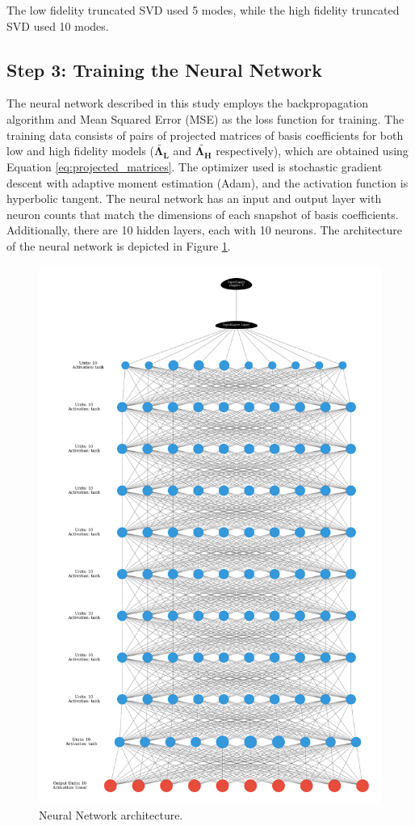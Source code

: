 \documentclass[10pt,oneside,a4paper,twocolumn]{article}
\begin{document}
The low fidelity truncated SVD used 5 modes, while the high fidelity truncated SVD used 10 modes.

\subsection{Step 3: Training the Neural Network}

The neural network described in this study employs the backpropagation algorithm and Mean Squared Error (MSE) as the loss function for training. The training data consists of pairs of projected matrices of basis coefficients for both low and high fidelity models ($\tilde{\mathbf{\Lambda_L}}$ and $\tilde{\mathbf{\Lambda_H}}$ respectively), which are obtained using Equation \eqref{eq:projected_matrices}. The optimizer used is stochastic gradient descent with adaptive moment estimation (Adam), and the activation function is hyperbolic tangent. The neural network has an input and output layer with neuron counts that match the dimensions of each snapshot of basis coefficients. Additionally, there are 10 hidden layers, each with 10 neurons. The architecture of the neural network is depicted in Figure \ref{fig:nn}.

\begin{figure}[htbp]
  \centering
  \includegraphics[width=\columnwidth]{figures/nn.pdf}
  \caption{Neural Network architecture.}
  \label{fig:nn}
\end{figure}
\end{document}
